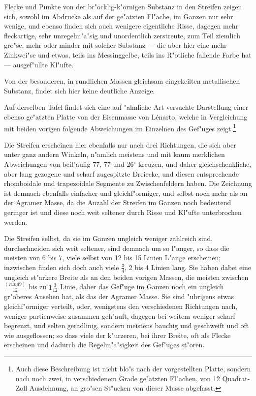 \documentclass[a4paper, 11pt, oneside, german]{article}
\begin{document}
Flecke und Punkte von der br"ocklig-k"ornigen Substanz in den Streifen zeigen sich, sowohl im Abdrucke als auf der ge"atzten Fl"ache, im Ganzen nur sehr wenige, und ebenso finden sich auch wenigere eigentliche Risse, dagegen mehr fleckartige, sehr unregelm"a"sig und unordentlich zerstreute, zum Teil ziemlich gro"se, mehr oder minder mit solcher Substanz --- die aber hier eine mehr Zinkwei"se und etwas, teils ins Messinggelbe, teils ins R"otliche fallende Farbe hat --- ausgef"ullte Kl"ufte.

Von der besonderen, in rundlichen Massen gleichsam eingekeilten metallischen Substanz, findet sich hier keine deutliche Anzeige.

Auf derselben Tafel findet sich eine auf "ahnliche Art versuchte Darstellung einer ebenso ge"atzten Platte von der Eisenmasse von Lénarto, welche in Vergleichung mit beiden vorigen folgende Abweichungen im Einzelnen des Gef"uges zeigt.\footnote{Auch diese Beschreibung ist nicht blo"s nach der vorgestellten Platte, sondern nach noch zwei, in verschiedenem Grade ge"atzten Fl"achen, von 12 Quadrat-Zoll Ausdehnung, an gro"sen St"ucken von dieser Masse abgefasst.}

Die Streifen erscheinen hier ebenfalls nur nach drei Richtungen, die sich aber unter ganz andern Winkeln, n"amlich meistens und mit kaum merklichen Abweichungen von beil"aufig 77, 77 und 26$^{\circ}$ kreuzen, und daher gleichschenkliche, aber lang gezogene und scharf zugespitzte Dreiecke, und diesen entsprechende rhomboidale und trapezoidale Segmente zu Zwischenfeldern haben. Die Zeichnung ist demnach ebenfalls einfacher und gleichf"ormiger, und selbst noch mehr als an der Agramer Masse, da die Anzahl der Streifen im Ganzen noch bedeutend geringer ist und diese noch weit seltener durch Risse und Kl"ufte unterbrochen werden.

Die Streifen selbst, da sie im Ganzen ungleich weniger zahlreich sind, durchschneiden sich weit seltener, sind demnach um so l"anger, so dass die meisten von 6 bis 7, viele selbst von 12 bis 15 Linien L"ange erscheinen; inzwischen finden sich doch auch viele $\frac{3}{4}$, 2 bis 4 Linien lang. Sie haben dabei eine ungleich st"arkere Breite als an den beiden vorigen Massen, die meisten zwischen $\frac{(7 und 9)}{12}$ bis zu $1\frac{3}{12}$ Linie, daher das Gef"uge im Ganzen noch ein ungleich gr"oberes Ansehen hat, als das der Agramer Masse. Sie sind "ubrigens etwas gleichf"ormiger verteilt, oder, wenigstens den verschiedenen Richtungen nach, weniger partienweise zusammen geh"auft, dagegen bei weitem weniger scharf begrenzt, und selten geradlinig, sondern meistens bauchig und geschweift und oft wie ausgeflossen; so dass viele der k"urzeren, bei ihrer Breite, oft als Flecke erscheinen und dadurch die Regelm"a"sigkeit des Gef"uges st"oren.
\end{document}
